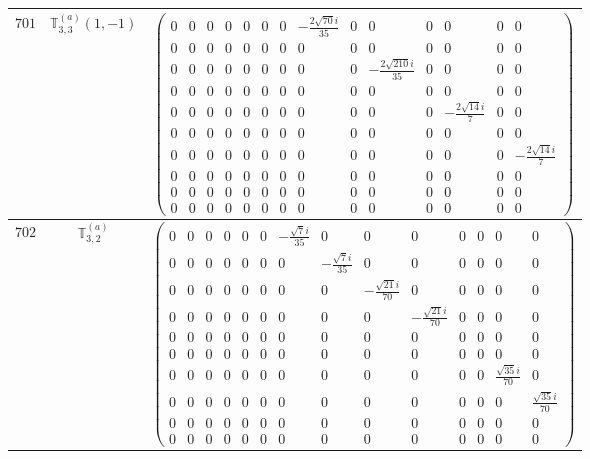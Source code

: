\documentclass[fleqn,8pt,landscape]{jsarticle}
\begin{document}
\begin{center}
\begin{longtable}{ccc}
$ 701 $ & $ \mathbb{T}_{3,3}^{(a)}(1,-1) $ & $ \begin{pmatrix} 0 & 0 & 0 & 0 & 0 & 0 & 0 & - \frac{2 \sqrt{70} i}{35} & 0 & 0 & 0 & 0 & 0 & 0 \\ 0 & 0 & 0 & 0 & 0 & 0 & 0 & 0 & 0 & 0 & 0 & 0 & 0 & 0 \\ 0 & 0 & 0 & 0 & 0 & 0 & 0 & 0 & 0 & - \frac{2 \sqrt{210} i}{35} & 0 & 0 & 0 & 0 \\ 0 & 0 & 0 & 0 & 0 & 0 & 0 & 0 & 0 & 0 & 0 & 0 & 0 & 0 \\ 0 & 0 & 0 & 0 & 0 & 0 & 0 & 0 & 0 & 0 & 0 & - \frac{2 \sqrt{14} i}{7} & 0 & 0 \\ 0 & 0 & 0 & 0 & 0 & 0 & 0 & 0 & 0 & 0 & 0 & 0 & 0 & 0 \\ 0 & 0 & 0 & 0 & 0 & 0 & 0 & 0 & 0 & 0 & 0 & 0 & 0 & - \frac{2 \sqrt{14} i}{7} \\ 0 & 0 & 0 & 0 & 0 & 0 & 0 & 0 & 0 & 0 & 0 & 0 & 0 & 0 \\ 0 & 0 & 0 & 0 & 0 & 0 & 0 & 0 & 0 & 0 & 0 & 0 & 0 & 0 \\ 0 & 0 & 0 & 0 & 0 & 0 & 0 & 0 & 0 & 0 & 0 & 0 & 0 & 0 \end{pmatrix} $ \\ \hline
$ 702 $ & $ \mathbb{T}_{3,2}^{(a)} $ & $ \begin{pmatrix} 0 & 0 & 0 & 0 & 0 & 0 & - \frac{\sqrt{7} i}{35} & 0 & 0 & 0 & 0 & 0 & 0 & 0 \\ 0 & 0 & 0 & 0 & 0 & 0 & 0 & - \frac{\sqrt{7} i}{35} & 0 & 0 & 0 & 0 & 0 & 0 \\ 0 & 0 & 0 & 0 & 0 & 0 & 0 & 0 & - \frac{\sqrt{21} i}{70} & 0 & 0 & 0 & 0 & 0 \\ 0 & 0 & 0 & 0 & 0 & 0 & 0 & 0 & 0 & - \frac{\sqrt{21} i}{70} & 0 & 0 & 0 & 0 \\ 0 & 0 & 0 & 0 & 0 & 0 & 0 & 0 & 0 & 0 & 0 & 0 & 0 & 0 \\ 0 & 0 & 0 & 0 & 0 & 0 & 0 & 0 & 0 & 0 & 0 & 0 & 0 & 0 \\ 0 & 0 & 0 & 0 & 0 & 0 & 0 & 0 & 0 & 0 & 0 & 0 & \frac{\sqrt{35} i}{70} & 0 \\ 0 & 0 & 0 & 0 & 0 & 0 & 0 & 0 & 0 & 0 & 0 & 0 & 0 & \frac{\sqrt{35} i}{70} \\ 0 & 0 & 0 & 0 & 0 & 0 & 0 & 0 & 0 & 0 & 0 & 0 & 0 & 0 \\ 0 & 0 & 0 & 0 & 0 & 0 & 0 & 0 & 0 & 0 & 0 & 0 & 0 & 0 \end{pmatrix} $ \\ \hline

\end{longtable}
\end{center}
\end{document}
